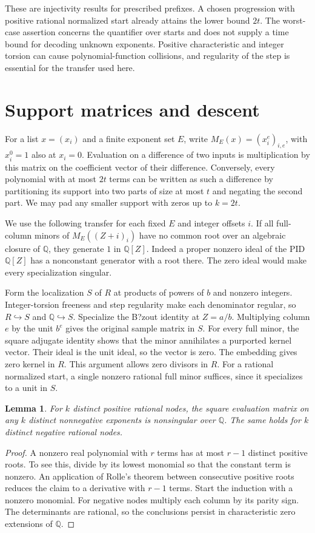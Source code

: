 \documentclass[10pt]{article}
\newtheorem{lemma}[theorem]{Lemma}
\newcommand{\Q}{\mathbb Q}
\begin{document}
These are injectivity results for prescribed prefixes. A chosen progression
with positive rational normalized start already attains the lower bound
$2t$. The worst-case assertion concerns the quantifier over starts and
does not supply a time bound for decoding unknown exponents. Positive
characteristic and integer torsion can cause polynomial-function
collisions, and regularity of the step is essential for the transfer used
here.

\section{Support matrices and descent}\label{sec:descent}
For a list $x=(x_i)$ and a finite exponent set $E$, write
$M_E(x)=(x_i^e)_{i,e}$, with $x_i^0=1$ also at $x_i=0$. Evaluation
on a difference of two inputs is multiplication by this matrix on the
coefficient vector of their difference. Conversely, every polynomial with
at most $2t$ terms can be written as such a difference by partitioning its
support into two parts of size at most $t$ and negating the second part.
We may pad any smaller support with zeros up to $k=2t$.

We use the following transfer for each fixed $E$ and integer offsets $i$.
If all full-column minors of $M_E((Z+i)_i)$ have no common root over an
algebraic closure of $\Q$, they generate $1$ in $\Q[Z]$. Indeed a proper
nonzero ideal of the PID $\Q[Z]$ has a nonconstant generator with a root
there. The zero ideal would make every specialization singular.

Form the localization $S$ of $R$ at products of powers of $b$ and
nonzero integers. Integer-torsion freeness and step regularity make each
denominator regular, so $R\hookrightarrow S$ and $\Q\hookrightarrow S$.
Specialize the B?zout identity at $Z=a/b$. Multiplying column $e$ by the
unit $b^e$ gives the original sample matrix in $S$. For every full minor,
the square adjugate identity shows that the minor annihilates a purported
kernel vector. Their ideal is the unit ideal, so the vector is zero.
The embedding gives zero kernel in $R$. This argument allows zero
divisors in $R$. For a rational normalized start, a single nonzero
rational full minor suffices, since it specializes to a unit in $S$.

\begin{lemma}\label{lem:sign}
For $k$ distinct positive rational nodes, the square evaluation matrix on
any $k$ distinct nonnegative exponents is nonsingular over $\Q$.
The same holds for $k$ distinct negative rational nodes.
\end{lemma}
\begin{proof}
A nonzero real polynomial with $r$ terms has at most $r-1$ distinct
positive roots. To see this, divide by its lowest monomial so that the
constant term is nonzero. An application of Rolle's theorem between
consecutive positive roots reduces the claim to a derivative with
$r-1$ terms. Start the induction with a nonzero monomial.
For negative nodes multiply each column by its parity sign. The
determinants are rational, so the conclusions persist in characteristic
zero extensions of $\Q$.
\end{proof}
\end{document}
